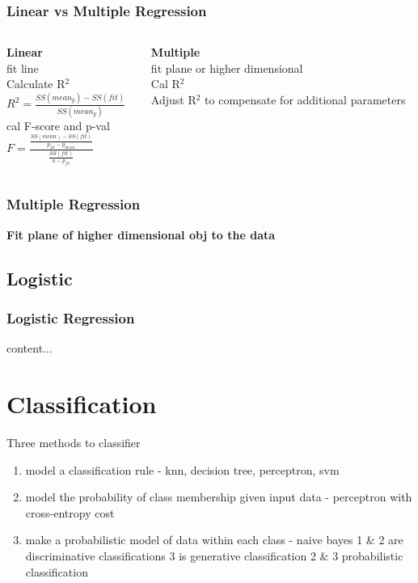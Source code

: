 \documentclass{beamer}
\begin{document}
\begin{frame}\frametitle{Linear vs Multiple Regression}
	\begin{columns}
		\begin{column}{0.5\textwidth}
			\textbf{Linear}\\
			fit line\\
			Calculate R$^2$\\
			$R^2 = \frac{SS(mean_y)-SS(fit)}{SS(mean_y)}$\\
			cal F-score and p-val\\
			$F = \frac{\frac{SS(mean)-SS(fit)}{p_{fit}-p_{mean}}}{\frac{SS(fit)}{n-p_{fit}}}$
		\end{column}
		\begin{column}{0.5\textwidth}
			\textbf{Multiple}\\
			fit plane or higher dimensional\\
			Cal R$^2$\\
			Adjust R$^2$ to compensate for additional parameters\\
		\end{column}
	\end{columns}
\end{frame}

\begin{frame}\frametitle{Multiple Regression}
	\textbf{Fit plane of higher dimensional obj to the data}\\
	
\end{frame}

\subsection{Logistic}
\begin{frame}\frametitle{Logistic Regression}
content...
\end{frame}










\section{Classification}
\begin{frame}
	Three methods to classifier
	\begin{enumerate}
		\item model a classification rule - knn, decision tree, perceptron, svm
		\item model the probability of class membership given input data - perceptron with cross-entropy cost
		\item make a probabilistic model of data within each class - naive bayes
		1 \& 2 are discriminative classifications
		3 is generative classification
		2 \& 3 probabilistic classification
	\end{enumerate}
\end{frame}
\end{document}
